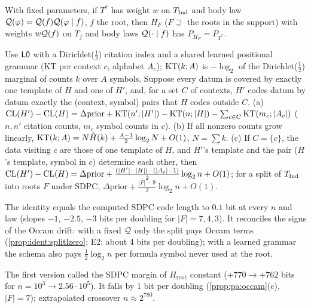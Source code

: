 \begin{proposition}\pabrk{}\label{prop:pa:chain}
With fixed parameters, if $T^*$ has weight $w$ on $T_{\mathrm{Ind}}$ and body law $\mathcal{Q}(\varphi)=\mathcal{Q}(f)\mathcal{Q}(\varphi\mid f)$, $f$ the root, then $H_F$ ($F\supseteq$ the roots in the support) with weights $w\mathcal{Q}(f)$ on $T_f$ and body laws $\mathcal{Q}(\cdot\mid f)$ has $P_{H_F}=P_{T^*}$.
\end{proposition}

\begin{proposition}\pabrk{}\label{prop:pa:occam}
Use $\mathord{\mathsf{L0}}$ with a Dirichlet($\frac12$) citation index and a shared learned positional grammar (KT per context $c$, alphabet $A_c$); $\mathrm{KT}(k;A)$ is $-\log_2$ of the Dirichlet($\frac12$) marginal of counts $k$ over $A$ symbols. Suppose every datum is covered by exactly one template of $H$ and one of $H'$, and, for a set $C$ of contexts, $H'$ codes datum by datum exactly the (context, symbol) pairs that $H$ codes outside $C$.
(a) $\mathrm{CL}(H')-\mathrm{CL}(H)=\Delta\mathrm{prior}+\mathrm{KT}(n';|H'|)-\mathrm{KT}(n;|H|)-\sum_{c\in C}\mathrm{KT}(m_c;|A_c|)$ ($n,n'$ citation counts, $m_c$ symbol counts in $c$).
(b) If all nonzero counts grow linearly, $\mathrm{KT}(k;A)=N\hat H(k)+\frac{A-1}2\log_2N+O(1)$, $N=\sum k$.
(c) If $C=\{c\}$, the data visiting $c$ are those of one template of $H$, and $H'$'s template and the pair ($H$'s template, symbol in $c$) determine each other, then $\mathrm{CL}(H')-\mathrm{CL}(H)=\Delta\mathrm{prior}+\frac{(|H'|-|H|)-(|A_c|-1)}2\log_2n+O(1)$; for a split of $T_{\mathrm{Ind}}$ into roots $F$ under SDPC, $\Delta\mathrm{prior}+\frac{|F|-9}2\log_2n+O(1)$.
\end{proposition}

\noindent The identity equals the computed SDPC code length to $0.1$ bit at every $n$ and law (slopes $-1$, $-2.5$, $-3$ bits per doubling for $|F|=7,4,3$). It reconciles the signs of the Occam drift: with a fixed $\mathcal{Q}$ only the split pays Occam terms (\cref{prop:ident:splitlzero}; E2: about 4 bits per doubling); with a learned grammar the schema also pays $\frac12\log_2n$ per formula symbol never used at the root.

\begin{remark}\pabrk{}
The first version called the SDPC margin of $H_{\mathrm{root}}$ constant ($+770\to+762$ bits for $n=10^3\to2.56\cdot10^5$). It falls by 1 bit per doubling (\cref{prop:pa:occam}(c), $|F|=7$); extrapolated crossover $n\approx2^{780}$.
\end{remark}

